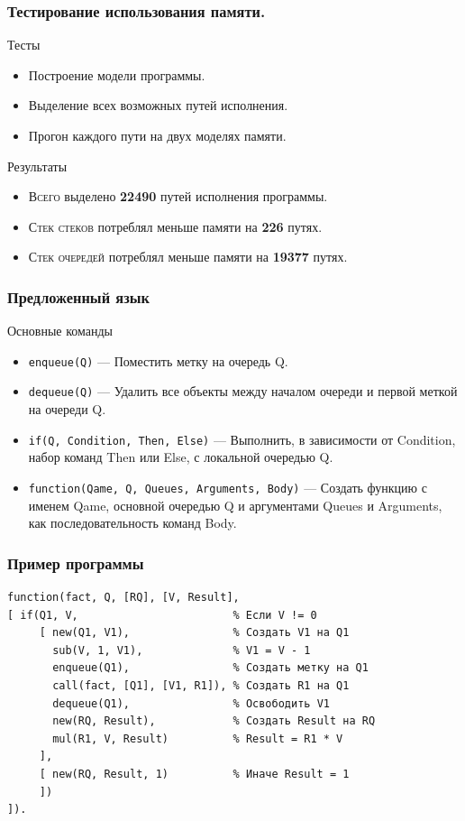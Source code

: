 \documentclass[ucs]{beamer}
\begin{document}
\begin{frame}
  \frametitle{Тестирование использования памяти.}
  
  \begin{block}{Тесты}
    \begin{itemize}
    \item Построение модели программы.
    \item Выделение всех возможных путей исполнения.
    \item Прогон каждого пути на двух моделях памяти.
    \end{itemize}
  \end{block}

  \begin{block}{Результаты}
    \begin{itemize}
    \item \textsc{Всего} выделено {\bf 22490} путей исполнения программы.
    \item \textsc{Стек стеков} потреблял меньше памяти на {\bf 226} путях.
    \item \textsc{Стек очередей} потреблял меньше памяти на {\bf 19377} путях.
    \end{itemize}
  \end{block}
\end{frame}

\begin{frame}[fragile]
  \frametitle{Предложенный язык}

  \begin{block}{Основные команды}
    \begin{itemize}
    \item \verb=enqueue(Q)= --- Поместить метку на очередь Q.
    \item \verb=dequeue(Q)= --- Удалить все объекты между началом очереди и
      первой меткой на очереди Q. 
    \item \verb=if(Q, Condition, Then, Else)= --- Выполнить, в зависимости
      от Condition, набор команд Then или Else, с локальной очередью Q.
    \item \verb=function(Qame, Q, Queues, Arguments, Body)= ---
      Создать функцию с именем Qame, основной очередью Q и аргументами
      Queues и Arguments, как последовательность команд Body.
    \end{itemize}
  \end{block}
\end{frame}

\begin{frame}[fragile]
  \frametitle{Пример программы}

\begin{verbatim}
function(fact, Q, [RQ], [V, Result],
[ if(Q1, V,                        % Если V != 0
     [ new(Q1, V1),                % Создать V1 на Q1
       sub(V, 1, V1),              % V1 = V - 1
       enqueue(Q1),                % Создать метку на Q1
       call(fact, [Q1], [V1, R1]), % Создать R1 на Q1
       dequeue(Q1),                % Освободить V1
       new(RQ, Result),            % Создать Result на RQ
       mul(R1, V, Result)          % Result = R1 * V
     ],
     [ new(RQ, Result, 1)          % Иначе Result = 1
     ])
]).
\end{verbatim}
\end{frame}
\end{document}
